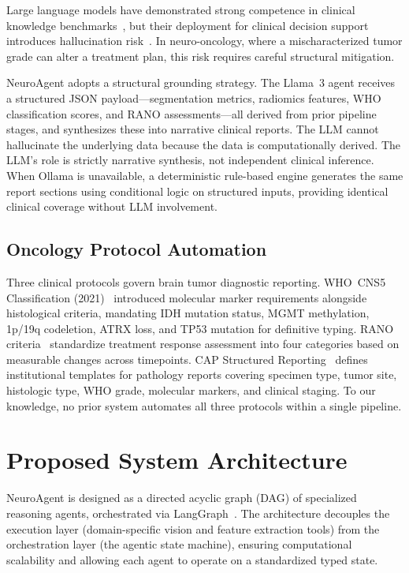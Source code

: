 \documentclass[journal]{IEEEtran}
\begin{document}
Large language models have demonstrated strong competence in clinical
knowledge benchmarks~\cite{singhal2023}, but their deployment for clinical
decision support introduces hallucination risk~\cite{kalai2025,das2025}.
In neuro-oncology, where a mischaracterized tumor grade can alter a
treatment plan, this risk requires careful structural mitigation.

NeuroAgent adopts a structural grounding strategy. The Llama~3 agent
receives a structured JSON payload---segmentation metrics, radiomics
features, WHO classification scores, and RANO assessments---all derived
from prior pipeline stages, and synthesizes these into narrative clinical
reports. The LLM cannot hallucinate the underlying data because the data
is computationally derived. The LLM's role is strictly narrative synthesis,
not independent clinical inference. When Ollama is unavailable, a
deterministic rule-based engine generates the same report sections using
conditional logic on structured inputs, providing identical clinical
coverage without LLM involvement.

\subsection{Oncology Protocol Automation}

Three clinical protocols govern brain tumor diagnostic reporting.
WHO~CNS5 Classification (2021)~\cite{louis2021} introduced molecular
marker requirements alongside histological criteria, mandating IDH
mutation status, MGMT methylation, 1p/19q codeletion, ATRX loss, and
TP53 mutation for definitive typing. RANO criteria~\cite{wen2010}
standardize treatment response assessment into four categories based on
measurable changes across timepoints. CAP Structured
Reporting~\cite{cap2024} defines institutional templates for pathology
reports covering specimen type, tumor site, histologic type, WHO grade,
molecular markers, and clinical staging. To our knowledge, no prior system
automates all three protocols within a single pipeline.

\section{Proposed System Architecture}

NeuroAgent is designed as a directed acyclic graph (DAG) of specialized
reasoning agents, orchestrated via LangGraph~\cite{langchain2024}. The
architecture decouples the execution layer (domain-specific vision and
feature extraction tools) from the orchestration layer (the agentic state
machine), ensuring computational scalability and allowing each agent to
operate on a standardized typed state.
\end{document}
